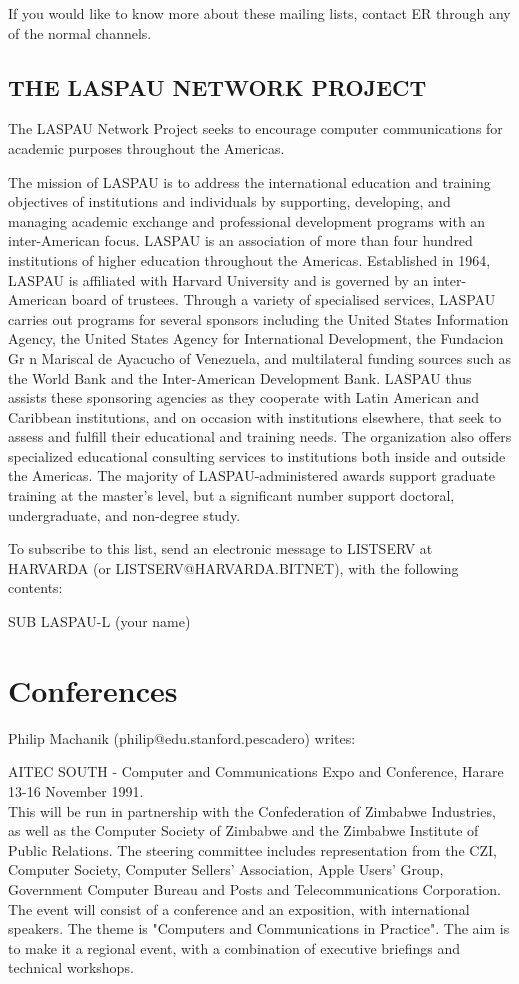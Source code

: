 If you would like to know more about these mailing lists, contact ER
through any of the normal channels.

\subsection{THE LASPAU NETWORK PROJECT}
The LASPAU Network Project seeks to encourage computer communications
for academic purposes throughout the Americas. 
 
The mission of LASPAU is to address the international education and
training objectives of institutions and individuals by supporting,
developing, and managing academic exchange and professional development
programs with an inter-American focus.  LASPAU is an association of more
than four hundred institutions of higher education throughout the
Americas.  Established in 1964, LASPAU is affiliated with Harvard
University and is governed by an inter-American board of trustees.
Through a variety of specialised services, LASPAU carries out programs
for several sponsors including the United States Information Agency, the
United States Agency for International Development, the Fundacion Gr n
Mariscal de Ayacucho of Venezuela, and multilateral funding sources such as
the World Bank and the Inter-American Development Bank.  LASPAU thus assists
these sponsoring agencies as they cooperate with Latin American and Caribbean
institutions, and on occasion with institutions elsewhere, that seek to assess
and fulfill their educational and training needs.  The organization also
offers specialized educational consulting services to institutions both inside
and outside the Americas.  The majority of LASPAU-administered awards support
graduate training at the master's level, but a significant number support
doctoral, undergraduate, and non-degree study.

To subscribe to this list, send an electronic message to
LISTSERV at HARVARDA (or LISTSERV@HARVARDA.BITNET), with the
following contents:
 
   SUB LASPAU-L (your name)

\section{Conferences} 
Philip Machanik (philip@edu.stanford.pescadero) writes:

AITEC SOUTH - Computer and Communications Expo and Conference, 
Harare 13-16 November 1991.\\
This will be run in partnership with the Confederation of Zimbabwe 
Industries, as well as the Computer Society of Zimbabwe and the 
Zimbabwe Institute of Public Relations. The steering committee 
includes representation from the CZI, Computer Society, Computer 
Sellers' Association, Apple Users' Group, Government Computer 
Bureau and Posts and Telecommunications Corporation.
The event will consist of a conference and an exposition, with 
international speakers. The theme is "Computers and 
Communications in Practice". The aim is to make it a regional event, 
with a combination of executive briefings and technical workshops.

